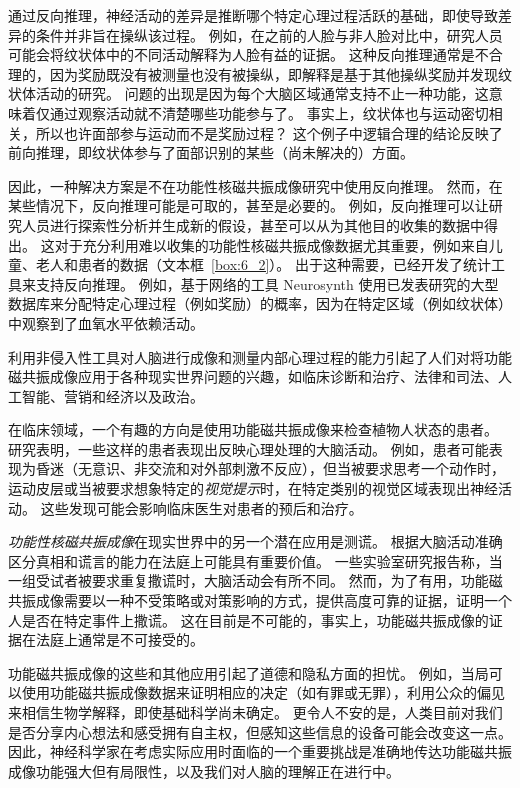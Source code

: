 通过反向推理，神经活动的差异是推断哪个特定心理过程活跃的基础，即使导致差异的条件并非旨在操纵该过程。 
例如，在之前的人脸与非人脸对比中，研究人员可能会将纹状体中的不同活动解释为人脸有益的证据。
这种反向推理通常是不合理的，因为奖励既没有被测量也没有被操纵，即解释是基于其他操纵奖励并发现纹状体活动的研究。
问题的出现是因为每个大脑区域通常支持不止一种功能，这意味着仅通过观察活动就不清楚哪些功能参与了。
事实上，纹状体也与运动密切相关，所以也许面部参与运动而不是奖励过程？
这个例子中逻辑合理的结论反映了前向推理，即纹状体参与了面部识别的某些（尚未解决的）方面。


因此，一种解决方案是不在功能性核磁共振成像研究中使用反向推理。
然而，在某些情况下，反向推理可能是可取的，甚至是必要的。
例如，反向推理可以让研究人员进行探索性分析并生成新的假设，甚至可以从为其他目的收集的数据中得出。
这对于充分利用难以收集的功能性核磁共振成像数据尤其重要，例如来自儿童、老人和患者的数据（文本框~\ref{box:6_2}）。
出于这种需要，已经开发了统计工具来支持反向推理。
例如，基于网络的工具 Neurosynth 使用已发表研究的大型数据库来分配特定心理过程（例如奖励）的概率，因为在特定区域（例如纹状体）中观察到了血氧水平依赖活动。


\begin{proposition}[现实世界中的大脑成像] \label{box:6_2}
	
	\quad \quad 利用非侵入性工具对人脑进行成像和测量内部心理过程的能力引起了人们对将功能磁共振成像应用于各种现实世界问题的兴趣，如临床诊断和治疗、法律和司法、人工智能、营销和经济以及政治。
	
	\quad \quad 在临床领域，一个有趣的方向是使用功能磁共振成像来检查植物人状态的患者。
	研究表明，一些这样的患者表现出反映心理处理的大脑活动。
	例如，患者可能表现为昏迷（无意识、非交流和对外部刺激不反应），但当被要求思考一个动作时，运动皮层或当被要求想象特定的\textit{视觉提示}时，在特定类别的视觉区域表现出神经活动。
	这些发现可能会影响临床医生对患者的预后和治疗。
	
	\quad \quad \textit{功能性核磁共振成像}在现实世界中的另一个潜在应用是测谎。
	根据大脑活动准确区分真相和谎言的能力在法庭上可能具有重要价值。
	一些实验室研究报告称，当一组受试者被要求重复撒谎时，大脑活动会有所不同。
	然而，为了有用，功能磁共振成像需要以一种不受策略或对策影响的方式，提供高度可靠的证据，证明一个人是否在特定事件上撒谎。
	这在目前是不可能的，事实上，功能磁共振成像的证据在法庭上通常是不可接受的。
	
	\quad \quad 功能磁共振成像的这些和其他应用引起了道德和隐私方面的担忧。
	例如，当局可以使用功能磁共振成像数据来证明相应的决定（如有罪或无罪），利用公众的偏见来相信生物学解释，即使基础科学尚未确定。
	更令人不安的是，人类目前对我们是否分享内心想法和感受拥有自主权，但感知这些信息的设备可能会改变这一点。
	因此，神经科学家在考虑实际应用时面临的一个重要挑战是准确地传达功能磁共振成像功能强大但有局限性，以及我们对人脑的理解正在进行中。
	
\end{proposition}



